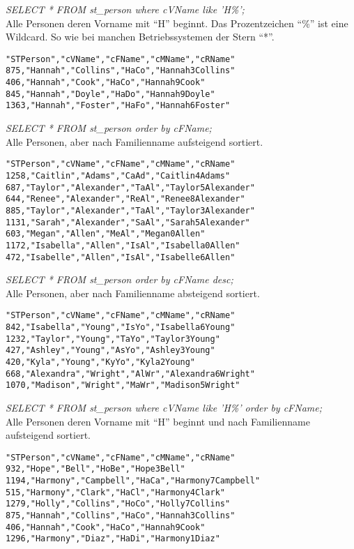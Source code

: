 \emph{SELECT * FROM st\_person where cVName like 'H\%';}\\
Alle Personen deren Vorname mit "`H"' beginnt.
Das Prozentzeichen "`\%"' ist eine Wildcard. So wie bei manchen Betriebssystemen der Stern "`*"'.
\begin{verbatim}
"STPerson","cVName","cFName","cMName","cRName"
875,"Hannah","Collins","HaCo","Hannah3Collins"
406,"Hannah","Cook","HaCo","Hannah9Cook"
845,"Hannah","Doyle","HaDo","Hannah9Doyle"
1363,"Hannah","Foster","HaFo","Hannah6Foster"
\end{verbatim}

\emph{SELECT * FROM st\_person order by cFName;}\\
Alle Personen, aber nach Familienname aufsteigend sortiert.
\begin{verbatim}
"STPerson","cVName","cFName","cMName","cRName"
1258,"Caitlin","Adams","CaAd","Caitlin4Adams"
687,"Taylor","Alexander","TaAl","Taylor5Alexander"
644,"Renee","Alexander","ReAl","Renee8Alexander"
885,"Taylor","Alexander","TaAl","Taylor3Alexander"
1131,"Sarah","Alexander","SaAl","Sarah5Alexander"
603,"Megan","Allen","MeAl","Megan0Allen"
1172,"Isabella","Allen","IsAl","Isabella0Allen"
472,"Isabelle","Allen","IsAl","Isabelle6Allen"
\end{verbatim}

\emph{SELECT * FROM st\_person order by cFName desc;}\\
Alle Personen, aber nach Familienname absteigend sortiert.
\begin{verbatim}
"STPerson","cVName","cFName","cMName","cRName"
842,"Isabella","Young","IsYo","Isabella6Young"
1232,"Taylor","Young","TaYo","Taylor3Young"
427,"Ashley","Young","AsYo","Ashley3Young"
420,"Kyla","Young","KyYo","Kyla2Young"
668,"Alexandra","Wright","AlWr","Alexandra6Wright"
1070,"Madison","Wright","MaWr","Madison5Wright"
\end{verbatim}

\emph{SELECT * FROM st\_person where cVName like 'H\%' order by cFName;}\\
Alle Personen deren Vorname mit "`H"' beginnt und nach Familienname aufsteigend sortiert.
\begin{verbatim}
"STPerson","cVName","cFName","cMName","cRName"
932,"Hope","Bell","HoBe","Hope3Bell"
1194,"Harmony","Campbell","HaCa","Harmony7Campbell"
515,"Harmony","Clark","HaCl","Harmony4Clark"
1279,"Holly","Collins","HoCo","Holly7Collins"
875,"Hannah","Collins","HaCo","Hannah3Collins"
406,"Hannah","Cook","HaCo","Hannah9Cook"
1296,"Harmony","Diaz","HaDi","Harmony1Diaz"
\end{verbatim}

